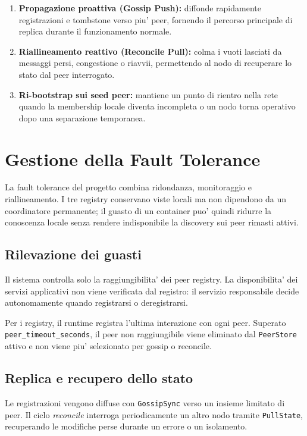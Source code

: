\documentclass[conference]{IEEEtran}
\begin{document}
\begin{enumerate}[leftmargin=1.2cm]
  \item \textbf{Propagazione proattiva (Gossip Push):} diffonde rapidamente registrazioni e tombstone verso piu' peer, fornendo il percorso principale di replica durante il funzionamento normale.
  
  \item \textbf{Riallineamento reattivo (Reconcile Pull):} colma i vuoti lasciati da messaggi persi, congestione o riavvii, permettendo al nodo di recuperare lo stato dal peer interrogato.
  
  \item \textbf{Ri-bootstrap sui seed peer:} mantiene un punto di rientro nella rete quando la membership locale diventa incompleta o un nodo torna operativo dopo una separazione temporanea.
\end{enumerate}

\section{Gestione della Fault Tolerance}
\label{sec:fault_tolerance}

La fault tolerance del progetto combina ridondanza, monitoraggio e riallineamento. I tre registry conservano viste locali ma non dipendono da un coordinatore permanente; il guasto di un container puo' quindi ridurre la conoscenza locale senza rendere indisponibile la discovery sui peer rimasti attivi.

\subsection{Rilevazione dei guasti}
Il sistema controlla solo la raggiungibilita' dei peer registry. La disponibilita' dei servizi applicativi non viene verificata dal registro: il servizio responsabile decide autonomamente quando registrarsi o deregistrarsi.

Per i registry, il runtime registra l'ultima interazione con ogni peer. Superato \texttt{peer\_timeout\_seconds}, il peer non raggiungibile viene eliminato dal \texttt{PeerStore} attivo e non viene piu' selezionato per gossip o reconcile.

\subsection{Replica e recupero dello stato}
Le registrazioni vengono diffuse con \texttt{GossipSync} verso un insieme limitato di peer. Il ciclo \textit{reconcile} interroga periodicamente un altro nodo tramite \texttt{PullState}, recuperando le modifiche perse durante un errore o un isolamento.
\end{document}

